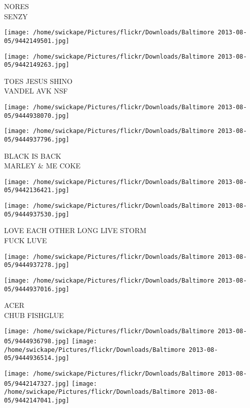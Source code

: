 \documentclass[10pt,letterpaper]{article}
\begin{document}
NORES\\
SENZY\\
\pagebreak

\texttt{[image: /home/swickape/Pictures/flickr/Downloads/Baltimore 2013-08-05/9442149501.jpg]}

\vspace{0.25in}
\texttt{[image: /home/swickape/Pictures/flickr/Downloads/Baltimore 2013-08-05/9442149263.jpg]}

TOES JESUS SHINO\\
VANDEL AVK NSF\\
\pagebreak

\texttt{[image: /home/swickape/Pictures/flickr/Downloads/Baltimore 2013-08-05/9444938070.jpg]}

\vspace{0.25in}
\texttt{[image: /home/swickape/Pictures/flickr/Downloads/Baltimore 2013-08-05/9444937796.jpg]}

BLACK IS BACK\\
MARLEY \& ME COKE\\
\pagebreak

\texttt{[image: /home/swickape/Pictures/flickr/Downloads/Baltimore 2013-08-05/9442136421.jpg]}

\vspace{0.25in}
\texttt{[image: /home/swickape/Pictures/flickr/Downloads/Baltimore 2013-08-05/9444937530.jpg]}

LOVE EACH OTHER LONG LIVE STORM\\
FUCK LUVE\\
\pagebreak

\texttt{[image: /home/swickape/Pictures/flickr/Downloads/Baltimore 2013-08-05/9444937278.jpg]}

\vspace{0.25in}
\texttt{[image: /home/swickape/Pictures/flickr/Downloads/Baltimore 2013-08-05/9444937016.jpg]}

ACER\\
CHUB FISHGLUE\\
\pagebreak

\texttt{[image: /home/swickape/Pictures/flickr/Downloads/Baltimore 2013-08-05/9444936798.jpg]}
\texttt{[image: /home/swickape/Pictures/flickr/Downloads/Baltimore 2013-08-05/9444936514.jpg]}

\texttt{[image: /home/swickape/Pictures/flickr/Downloads/Baltimore 2013-08-05/9442147327.jpg]}
\texttt{[image: /home/swickape/Pictures/flickr/Downloads/Baltimore 2013-08-05/9442147041.jpg]}
\end{document}
